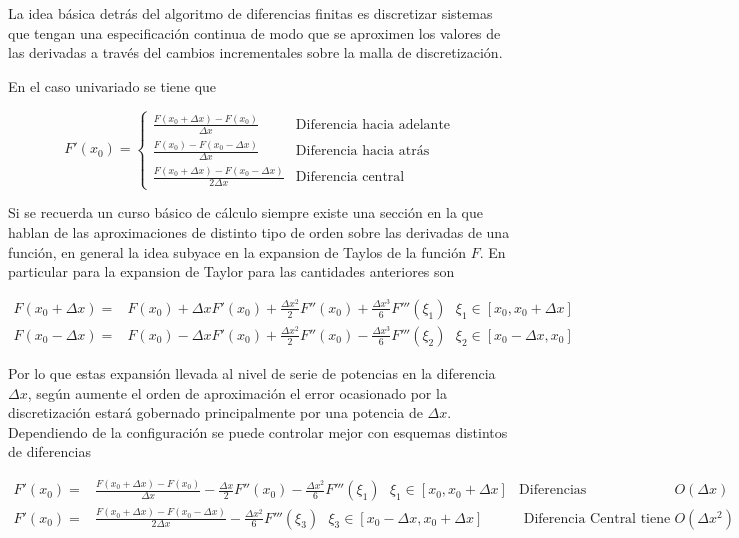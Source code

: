 \documentclass[]{article}
\begin{document}
La idea básica detrás del algoritmo de diferencias finitas es
discretizar sistemas que tengan una especificación continua de modo que
se aproximen los valores de las derivadas a través del cambios
incrementales sobre la malla de discretización.

En el caso univariado se tiene que

\begin{equation}
 F'(x_0)= \begin{cases} 
           \frac{F ( x_0 + \Delta x  )- F ( x_0 )}{\Delta x} & \text{Diferencia hacia adelante} \\
           \frac{F ( x_0)- F ( x_0-\Delta x  )}{\Delta x} & \text{Diferencia hacia atrás} \\
          \frac{F ( x_0 + \Delta x  )- F ( x_0 - \Delta x )}{2 \Delta x} & \text{Diferencia central} 
   \end{cases}
\end{equation}

Si se recuerda un curso básico de cálculo siempre existe una sección en
la que hablan de las aproximaciones de distinto tipo de orden sobre las
derivadas de una función, en general la idea subyace en la expansion de
Taylos de la función \(F\). En particular para la expansion de Taylor
para las cantidades anteriores son

\begin{eqnarray}
F ( x_0 + \Delta x ) =& F ( x_0 ) + \Delta x F'( x_0 ) + \frac{\Delta x^2}{2}F''(x_0)  + \frac{\Delta x^3}{6} F'''( \xi_1 ) \text{ } \xi_1 \in [x_0,x_0 + \Delta x] \\
F ( x_0 - \Delta x ) =& F ( x_0 ) - \Delta x F'( x_0 ) + \frac{\Delta x^2}{2}F''(x_0)  - \frac{\Delta x^3}{6} F'''( \xi_2 ) \text{ } \xi_2 \in [x_0-\Delta x,x_0 ]
\end{eqnarray}

Por lo que estas expansión llevada al nivel de serie de potencias en la
diferencia \(\Delta x\), según aumente el orden de aproximación el error
ocasionado por la discretización estará gobernado principalmente por una
potencia de \(\Delta x\). Dependiendo de la configuración se puede
controlar mejor con esquemas distintos de diferencias

\begin{align}
F'( x_0 ) =& \frac{F ( x_0 + \Delta x )-F ( x_0 )}{\Delta x} - \frac{\Delta x}{2}F''(x_0) - \frac{\Delta x^2}{6} F'''( \xi_1 )\text{ }  \xi_1 \in [x_0,x_0 + \Delta x] & \text{Diferencias Adelante/Atrás tiene un error de orden } O(\Delta x) \\
F'( x_0 ) =& \frac{F ( x_0 + \Delta x )-F ( x_0 - \Delta x )}{2 \Delta x} - \frac{\Delta x^2}{6}F'''( \xi_3 )  \text{ } \xi_3 \in [x_0 - \Delta x, x_0 + \Delta x] & \text{ Diferencia Central tiene un error de orden } O(\Delta x^2)
\end{align}
\end{document}
